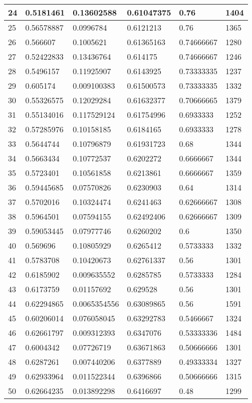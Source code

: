\begin{longtable}{|l|l|l|l|l|l|}
24 & 0.5181461 & 0.13602588 & 0.61047375 & 0.76 & 1404 \\ \hline 
25 & 0.56578887 & 0.0996784 & 0.6121213 & 0.76 & 1365 \\ \hline 
26 & 0.566607 & 0.1005621 & 0.61365163 & 0.74666667 & 1280 \\ \hline 
27 & 0.52422833 & 0.13436764 & 0.614175 & 0.74666667 & 1246 \\ \hline 
28 & 0.5496157 & 0.11925907 & 0.6143925 & 0.73333335 & 1237 \\ \hline 
29 & 0.605174 & 0.009100383 & 0.61500573 & 0.73333335 & 1332 \\ \hline 
30 & 0.55326575 & 0.12029284 & 0.61632377 & 0.70666665 & 1379 \\ \hline 
31 & 0.55134016 & 0.117529124 & 0.61754996 & 0.6933333 & 1252 \\ \hline 
32 & 0.57285976 & 0.10158185 & 0.6184165 & 0.6933333 & 1278 \\ \hline 
33 & 0.5644744 & 0.10796879 & 0.61931723 & 0.68 & 1344 \\ \hline 
34 & 0.5663434 & 0.10772537 & 0.6202272 & 0.6666667 & 1344 \\ \hline 
35 & 0.5723401 & 0.10561858 & 0.6213861 & 0.6666667 & 1359 \\ \hline 
36 & 0.59445685 & 0.07570826 & 0.6230903 & 0.64 & 1314 \\ \hline 
37 & 0.5702016 & 0.10324474 & 0.6241463 & 0.62666667 & 1308 \\ \hline 
38 & 0.5964501 & 0.07594155 & 0.62492406 & 0.62666667 & 1309 \\ \hline 
39 & 0.59053445 & 0.07977746 & 0.6260202 & 0.6 & 1350 \\ \hline 
40 & 0.569696 & 0.10805929 & 0.6265412 & 0.5733333 & 1332 \\ \hline 
41 & 0.5783708 & 0.10420673 & 0.62761337 & 0.56 & 1301 \\ \hline 
42 & 0.6185902 & 0.009635552 & 0.6285785 & 0.5733333 & 1284 \\ \hline 
43 & 0.6173759 & 0.01157692 & 0.629528 & 0.56 & 1301 \\ \hline 
44 & 0.62294865 & 0.0065354556 & 0.63089865 & 0.56 & 1591 \\ \hline 
45 & 0.60206014 & 0.076058045 & 0.63292783 & 0.5466667 & 1324 \\ \hline 
46 & 0.62661797 & 0.009312393 & 0.6347076 & 0.53333336 & 1484 \\ \hline 
47 & 0.6004342 & 0.07726719 & 0.63671863 & 0.50666666 & 1301 \\ \hline 
48 & 0.6287261 & 0.007440206 & 0.6377889 & 0.49333334 & 1327 \\ \hline 
49 & 0.62933964 & 0.011522344 & 0.6396866 & 0.50666666 & 1315 \\ \hline 
50 & 0.62664235 & 0.013892298 & 0.6416697 & 0.48 & 1299 \\ \hline 
\end{longtable}